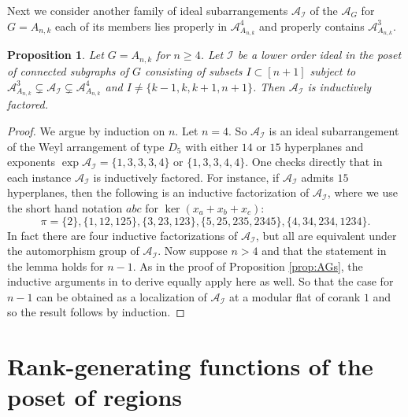 \documentclass[12pt]{amsart}
\newcommand\CA{{\mathscr A}}
\newcommand\CI{{\mathcal I}}
\numberwithin{equation}{section}
\theoremstyle{plain}
\newtheorem{prop}[equation]{Proposition}
\theoremstyle{definition}
\begin{document}
Next we consider another family of ideal subarrangements $\CA_\CI$ of the $\CA_G$  for $G = A_{n,k}$ each of its members lies properly in $\CA_{A_{n,k}}^4$ and properly contains $\CA_{A_{n,k}}^3$.

\begin{prop}
    \label{prop:AGs2}
    Let $G =  A_{n,k}$ for $n\ge 4$. Let $\CI$ be a lower order ideal in the poset of connected subgraphs of $G$ consisting of subsets $I \subset [n+1]$ subject to 
   $\CA_{A_{n,k}}^3 \subsetneq \CA_\CI  \subsetneq \CA_{A_{n,k}}^4$ 
    and $I \ne \{k-1, k, k+1, n+1\}$.  Then
$\CA_\CI$ is inductively factored.     
\end{prop}

\begin{proof}
    We argue by induction on $n$. Let $n = 4$. So $\CA_\CI$ is an ideal subarrangement of the Weyl arrangement of type $D_5$ with either $14$ or $15$ hyperplanes and exponents $\exp \CA_\CI = \{1,3,3,3,4\}$ or $\{1,3,3,4,4\}$.  
    One checks directly that in each instance $\CA_\CI$ is inductively factored. 
    For instance, if $\CA_\CI$ admits $15$ hyperplanes, then 
    the following is an inductive factorization of 
    $\CA_\CI$, where we use the short hand notation $abc$ for $\ker (x_a +x_b+ x_c)$:
    \[
\pi = \{2\}, \{1,12,125\}, \{3,23,123\}, \{5,25,235,2345\}, \{4,34,234,1234\}. 
    \]
    In fact there are four inductive factorizations of $\CA_\CI$, but all are equivalent under the automorphism group of $\CA_\CI$.
    Now suppose $n > 4$ and that the statement in the lemma holds for $n-1$. 
    As in the proof of 
    Proposition \ref{prop:AGs}, the inductive arguments in 
\cite{roehrle:ideal} to derive \cite[Thm.~1.31]{roehrle:ideal} equally apply 
here as well. So that the case for $n-1$ can be obtained as a localization of 
    $\CA_\CI$ at a modular flat of corank $1$ and so the result follows by induction. 
\end{proof}

\section{Rank-generating functions of the poset of regions}
\label{s:rankgenerating}
\end{document}
